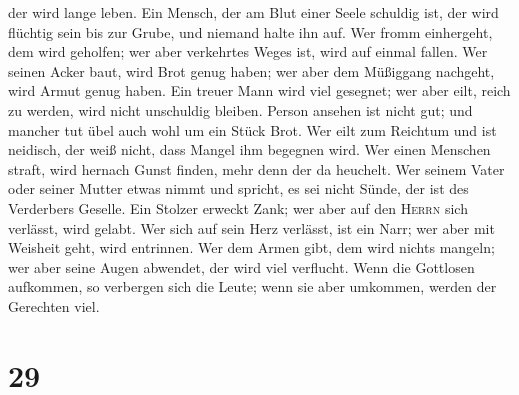 der wird lange leben.  Ein Mensch, der am Blut einer
Seele schuldig ist, der wird flüchtig sein bis zur Grube, und niemand
halte ihn auf.  Wer fromm einhergeht, dem wird geholfen;
wer aber verkehrtes Weges ist, wird auf einmal fallen. 
Wer seinen Acker baut, wird Brot genug haben; wer aber dem Müßiggang
nachgeht, wird Armut genug haben.  Ein treuer Mann wird
viel gesegnet; wer aber eilt, reich zu werden, wird nicht unschuldig
bleiben.  Person ansehen ist nicht gut; und mancher tut
übel auch wohl um ein Stück Brot.  Wer eilt zum Reichtum
und ist neidisch, der weiß nicht, dass Mangel ihm begegnen wird.
 Wer einen Menschen straft, wird hernach Gunst finden,
mehr denn der da heuchelt.  Wer seinem Vater oder seiner
Mutter etwas nimmt und spricht, es sei nicht Sünde, der ist des
Verderbers Geselle.  Ein Stolzer erweckt Zank; wer aber
auf den \textsc{Herrn} sich verlässt, wird gelabt.  Wer
sich auf sein Herz verlässt, ist ein Narr; wer aber mit Weisheit geht,
wird entrinnen.  Wer dem Armen gibt, dem wird nichts
mangeln; wer aber seine Augen abwendet, der wird viel verflucht.
 Wenn die Gottlosen aufkommen, so verbergen sich die
Leute; wenn sie aber umkommen, werden der Gerechten viel.

\hypertarget{section-28}{%
\section{29}\label{section-28}}

